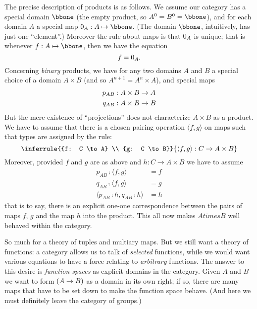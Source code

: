 The precise description of products is as follows. We as­sume our category has a special domain $\bbone$ (the empty product, so $A^0 = B^0 = {\bbone}$), and for each domain $A$ a special map $\zeromap_A: A \mapsto \bbone$. (The domain $\bbone$, intuitively, has just one ``element''.)  Moreover the rule about maps is that $0_A$ is unique; that is whenever $f : A \mapsto \bbone$, then we have the equation
$$f = 0_A .$$
%
Concerning {\it binary} products, we have for any two domains $A$ and $B$ a special choice of a domain $A \times B$ (and so $A^{n+1} = A^n \times A$), and special maps
\begin{align*}
p_{AB}&: A \times B \rightarrow A\\
q_{AB}&: A \times B \rightarrow B
\end{align*}
%
But the mere existence of ``projections'' does not characterize $A \times B$ as a product. We have to assume that there is a chosen pairing operation $\langle f,g \rangle$ on maps such that types are assigned by the rule:
%
$$
\inferrule
  {{f: C \to A} \\ {g: C \to B}}
  {\langle f,g \rangle: C \to A \times B}
$$
%
Moreover, provided $f$ and $g$ are as above and $h: C \to A \times B $ we have to assume
\begin{align*}
p_{AB} \comp \langle f,g \rangle &= f\\
q_{AB} \comp \langle f,g \rangle &= g\\
\langle p_{AB}\comp h, q_{AB}\comp h\rangle &= h
\end{align*}
%
that is to say, there is an explicit one-one correspondence between the pairs of maps $f$, $g$ and the map $h$ into the product. This all now makes $A times B$ well behaved within the category.

So much for a theory of tuples and multiary maps. But we still want a theory of functions: a category allows us to talk of {\it selected} functions, while we would want various equations to have a force relating to {\it arbitrary} functions. The answer to this desire is {\it function spaces} as explicit domains in the cate­gory. Given $A$ and $B$ we want to form $(A \rightarrow B)$ as a domain in its own right; if so, there are many maps that have to be set down to make the function space behave. (And here we must defi­nitely leave the category of groups.)

